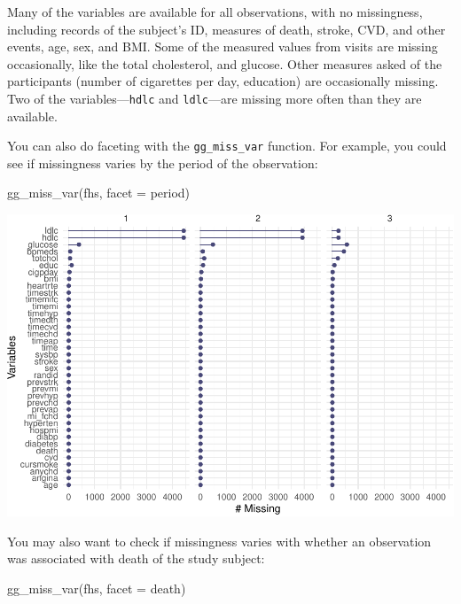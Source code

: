 \documentclass[
]{book}
\newenvironment{Shaded}{\begin{snugshade}}{\end{snugshade}}
\newcommand{\AttributeTok}[1]{\textcolor[rgb]{0.77,0.63,0.00}{#1}}
\newcommand{\FunctionTok}[1]{\textcolor[rgb]{0.00,0.00,0.00}{#1}}
\newcommand{\NormalTok}[1]{#1}
\begin{document}
Many of the variables are available for all observations, with no missingness,
including records of the subject's ID, measures of death, stroke, CVD, and other
events, age, sex, and BMI. Some of the measured values from visits are missing
occasionally, like the total cholesterol, and glucose. Other measures asked of
the participants (number of cigarettes per day, education) are occasionally
missing. Two of the variables---\texttt{hdlc} and \texttt{ldlc}---are missing more often than
they are available.

You can also do faceting with the \texttt{gg\_miss\_var} function. For
example, you could see if missingness varies by the period of the observation:

\begin{Shaded}
\begin{Highlighting}[]
\FunctionTok{gg\_miss\_var}\NormalTok{(fhs, }\AttributeTok{facet =}\NormalTok{ period)}
\end{Highlighting}
\end{Shaded}

\includegraphics{adv_epi_analysis_files/figure-latex/unnamed-chunk-76-1.pdf}

You may also want to check if missingness varies with whether an observation
was associated with death of the study subject:

\begin{Shaded}
\begin{Highlighting}[]
\FunctionTok{gg\_miss\_var}\NormalTok{(fhs, }\AttributeTok{facet =}\NormalTok{ death)}
\end{Highlighting}
\end{Shaded}
\end{document}
